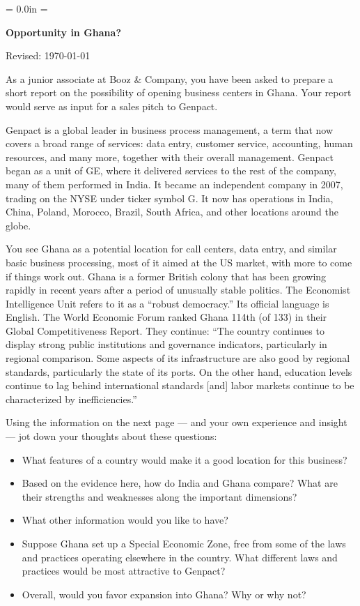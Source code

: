 \documentclass[12pt]{article}
\def\HeadName{Opportunity in Ghana?}
\begin{document}
\parindent = 0.0in
\parskip = \bigskipamount
\thispagestyle{empty}%
\Head

\centerline{\large \bf \HeadName}%
\centerline{Revised:  \today}

\bigskip
As a junior associate at Booz \& Company, you have been asked to
prepare a short report on the possibility of
opening business centers in Ghana.
Your report would serve as input for a sales pitch to Genpact.

Genpact is a global leader in business process management,
a term that now covers a broad range of services:
data entry, customer service, accounting, human resources,
and many more,
together with their overall management.
Genpact began as a unit of GE, where it delivered services to
the rest of the company, many of them performed in India.
It became an independent company in 2007,
trading on the NYSE under ticker symbol G.
It now has operations in India, China, Poland, Morocco, Brazil,
South Africa, and other locations around the globe.

You see Ghana as a potential location for call centers,
data entry, and similar basic business processing,
most of it aimed at the US market,
with more to come if things work out.
Ghana is a former British colony that has been growing rapidly
in recent years after a period of unusually stable politics.
The Economist Intelligence Unit refers to it as a ``robust democracy.''
Its official language is English.
The World Economic Forum ranked Ghana 114th (of 133)
in their Global Competitiveness Report.
They continue:
``The country continues to display strong public institutions and
governance indicators,
particularly in regional comparison. Some
aspects of its infrastructure are also good
by regional standards, particularly the state of its ports.
On the other hand, education levels continue to lag
behind international standards [and]
labor markets continue to be characterized by inefficiencies.''

Using the information on the next page ---
and your own experience and insight ---
jot down your thoughts about these questions:
%
\begin{itemize}
\item What features of a country would make it a good location for this business?
\item Based on the evidence here, how do India and Ghana compare?
What are their strengths and weaknesses along the important dimensions?
\item What other information would you like to have?
\item Suppose Ghana set up a Special Economic Zone,
free from some of the laws and practices operating elsewhere in the country.
What different laws and practices would be most attractive to Genpact?
\item Overall, would you favor expansion into Ghana?
Why or why not?
\end{itemize}
\end{document}
